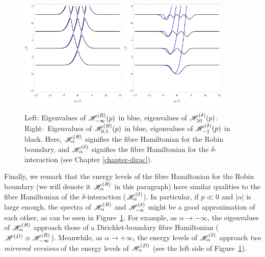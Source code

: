 \begin{figure}[t]
    \centering
    \noindent
    \includegraphics[width=0.45\textwidth]{grafy/dirac-dirichlet.pdf}%
    \hspace{0.1\textwidth}%
    \includegraphics[width=0.45\textwidth]{grafy/dirac-robin.pdf}%
    \caption{Left: Eigenvalues of $\mathscr{H}_{-\infty}^{\mathrm (R)}(p)$ in blue, eigenvalues of $\mathscr{H}_{10}^{\mathrm (\delta)}(p)$. Right:~Eigenvalues of $\mathscr{H}_{0.5}^{\mathrm (R)}(p)$ in blue, eigenvalues of $\mathscr{H}_{-1}^{\mathrm (\delta)}(p)$ in black. Here, $\mathscr{H}_\alpha^{\mathrm (R)}$ signifies the fibre Hamiltonian for the Robin boundary, and $\mathscr{H}_\alpha^{\mathrm (\delta)}$ signifies the fibre Hamiltonian for the $\delta$-interaction (see Chapter \ref{chapter-dirac}).}
    \label{plots-dirac-robin}
\end{figure}

Finally, we remark that the energy levels of the fibre Hamiltonian for the Robin boundary (we will denote it $\mathscr{H}_\alpha^{\mathrm (R)}$ in this paragraph) have similar qualities to the fibre Hamiltonian of the $\delta$-interaction ($\mathscr{H}_\alpha^{\mathrm (\delta)}$). In particular, if $p \ll 0$ and $|\alpha|$ is large enough, the spectra of $\mathscr{H}_\alpha^{\mathrm (R)}$ and $\mathscr{H}_{-\alpha}^{\mathrm (\delta)}$ might be a good approximation of each other, as can be seen in Figure~\ref{plots-dirac-robin}. For example, as $\alpha \to -\infty$, the eigenvalues of $\mathscr{H}_\alpha^{\mathrm (R)}$ approach those of a Dirichlet-boundary fibre Hamiltonian ($\mathscr{H}^{\mathrm (D)} \equiv \mathscr{H}_{-\infty}^{\mathrm (R)}$). Meanwhile, as $\alpha \to +\infty$, the energy levels of $\mathscr{H}_\alpha^{\mathrm (\delta)}$ approach \textit{two mirrored versions} of the energy levels of $\mathscr{H}_\alpha^{\mathrm (D)}$ (see the left side of Figure~\ref{plots-dirac-robin}).

